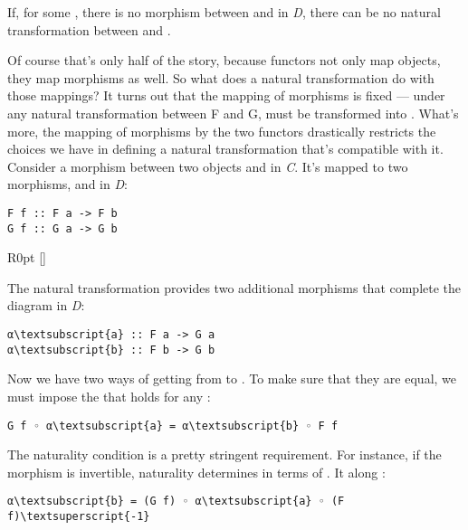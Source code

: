 If, for some , there is no morphism between  and
 in \emph{D}, there can be no natural transformation
between  and .

Of course that's only half of the story, because functors not only map
objects, they map morphisms as well. So what does a natural
transformation do with those mappings? It turns out that the mapping of
morphisms is fixed --- under any natural transformation between F and G,
 must be transformed into . What's more, the
mapping of morphisms by the two functors drastically restricts the
choices we have in defining a natural transformation that's compatible
with it. Consider a morphism  between two objects 
and  in \emph{C}. It's mapped to two morphisms, 
and  in \emph{D}:

\begin{Verbatim}[commandchars=\\\{\}]
F f :: F a -> F b
G f :: G a -> G b
\end{Verbatim}

\begin{wrapfigure}[5]{R}{0pt}
\raisebox{0pt}[\dimexpr{}\baselineskip\relax]{
}%
\end{wrapfigure}
\noindent
The natural transformation  provides two additional morphisms
that complete the diagram in \emph{D}:

\begin{Verbatim}[commandchars=\\\{\}]
α\textsubscript{a} :: F a -> G a
α\textsubscript{b} :: F b -> G b
\end{Verbatim}
Now we have two ways of getting from  to . To
make sure that they are equal, we must impose the  that holds for any :

\begin{Verbatim}[commandchars=\\\{\}]
G f ◦ α\textsubscript{a} = α\textsubscript{b} ◦ F f
\end{Verbatim}
The naturality condition is a pretty stringent requirement. For
instance, if the morphism  is invertible, naturality
determines  in terms of . It 
 along :

\begin{Verbatim}[commandchars=\\\{\}]
α\textsubscript{b} = (G f) ◦ α\textsubscript{a} ◦ (F f)\textsuperscript{-1}
\end{Verbatim}


